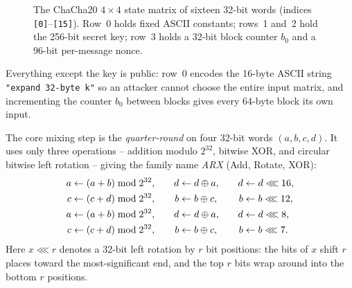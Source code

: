 \begin{figure}[htbp]
\caption{The ChaCha20 $4\times4$ state matrix of sixteen 32-bit words (indices \texttt{[0]}--\texttt{[15]}). Row~0 holds fixed ASCII constants; rows~1 and~2 hold the 256-bit secret key; row~3 holds a 32-bit block counter $b_0$ and a 96-bit per-message nonce.}
\label{ch10:fig-state}
\end{figure}

\noindent Everything except the key is public: row~0 encodes the 16-byte ASCII string \texttt{"expand 32-byte k"} so an attacker cannot choose the entire input matrix, and incrementing the counter $b_0$ between blocks gives every 64-byte block its own input.

The core mixing step is the \emph{quarter-round} on four 32-bit words $(a,b,c,d)$. It uses only three operations -- addition modulo $2^{32}$, bitwise XOR, and circular bitwise left rotation -- giving the family name \emph{ARX} (Add, Rotate, XOR):
\begin{align*}
  a &\gets (a + b) \bmod 2^{32}, &\quad d &\gets d \oplus a, &\quad d &\gets d \lll 16, \\
  c &\gets (c + d) \bmod 2^{32}, &\quad b &\gets b \oplus c, &\quad b &\gets b \lll 12, \\
  a &\gets (a + b) \bmod 2^{32}, &\quad d &\gets d \oplus a, &\quad d &\gets d \lll 8, \\
  c &\gets (c + d) \bmod 2^{32}, &\quad b &\gets b \oplus c, &\quad b &\gets b \lll 7.
\end{align*}
Here $x \lll r$ denotes a 32-bit left rotation by $r$ bit positions: the bits of $x$ shift $r$ places toward the most-significant end, and the top $r$ bits wrap around into the bottom $r$ positions.

